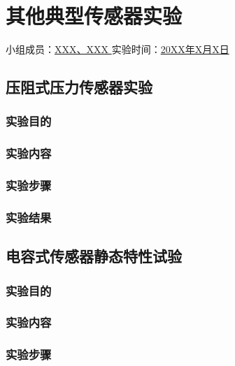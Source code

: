 \section{其他典型传感器实验}

\begin{center}
    {
        小组成员：\underline{\quad XXX、XXX \quad} \quad
        实验时间：\underline{\quad 20XX年X月X日 \quad}
    }
\end{center}

\subsection{压阻式压力传感器实验}

\subsubsection{实验目的}

\subsubsection{实验内容}

\subsubsection{实验步骤}

\subsubsection{实验结果}

\subsection{电容式传感器静态特性试验}

\subsubsection{实验目的}

\subsubsection{实验内容}

\subsubsection{实验步骤}

